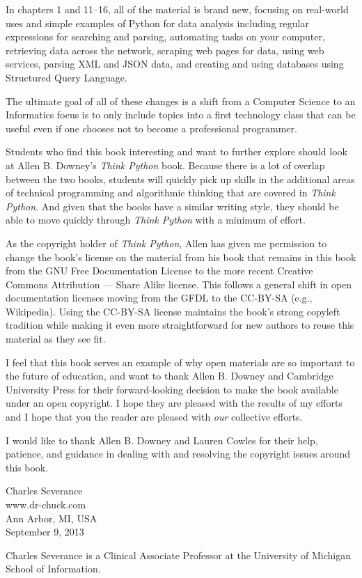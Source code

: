 In chapters 1 and 11--16, all of the material is brand new, focusing
on real-world uses and simple examples of Python for data analysis 
including regular expressions for searching and parsing, 
automating tasks on your computer, retrieving data across 
the network, scraping web pages for data, 
using web services, parsing XML and JSON data, and creating 
and using databases using Structured Query Language.

The ultimate goal of all of these changes is a shift from a 
Computer Science to an Informatics
focus is to only include topics into a first technology 
class that can be useful even if one chooses not to 
become a professional programmer.

Students who find this book interesting and want to further explore
should look at Allen B. Downey's \emph{Think Python} book.  Because there
is a lot of overlap between the two books,
students will quickly pick up skills in the additional
areas of technical programming and algorithmic thinking 
that are covered in \emph{Think Python}.
And given that the books have a similar writing style, they should be 
able to move quickly through \emph{Think Python} with a minimum of effort.

As the copyright holder of \emph{Think Python},
Allen has given me permission to change the book's license 
on the material from his book that remains in this book
from the
GNU Free Documentation License 
to the more recent
Creative Commons Attribution --- Share Alike
license.
This follows a general shift in open documentation licenses moving 
from the GFDL to the CC-BY-SA (e.g., Wikipedia).
Using the CC-BY-SA license maintains the book's 
strong copyleft tradition while making it even more straightforward 
for new authors to reuse this material as they see fit.

I feel that this book serves an example of why open 
materials are so important to the future of education,
and want to thank Allen B. Downey and Cambridge University
Press for their forward-looking decision to make the book available
under an open copyright.   I hope they are pleased with the 
results of my efforts and I hope that you the reader are pleased with
\emph{our} collective efforts.

I would like to thank Allen B. Downey and Lauren Cowles for their help,
patience, and guidance in dealing with and resolving the copyright 
issues around this book.

Charles Severance\\
www.dr-chuck.com\\
Ann Arbor, MI, USA\\
September 9, 2013

Charles Severance is a 
Clinical Associate Professor 
at the University of Michigan School of Information.

\clearemptydoublepage

\begin{latexonly}

\tableofcontents

\clearemptydoublepage

\end{latexonly}

\mainmatter

